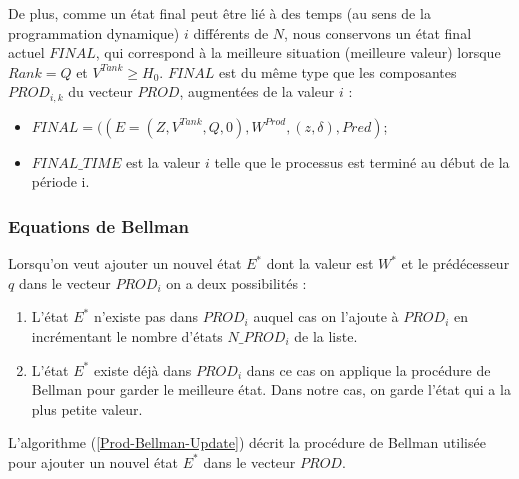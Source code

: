  De plus, comme un état final peut être lié à des temps (au sens de la programmation dynamique) $i$ différents de $N$, nous conservons un état final actuel $FINAL$, qui correspond à la meilleure situation (meilleure valeur) lorsque $Rank = Q$ et $V^{Tank} \geq H_0$. $FINAL$ est du même type que les composantes $PROD_{i,k}$ du vecteur $PROD$, augmentées de la valeur $i$ : 
\begin{itemize}[label=$\square$]

	\item $FINAL = ((E = (Z, V^{Tank}, Q, 0), W^{Prod}, (z,\delta ), Pred) $; 

	\item $FINAL\_TIME$ est la valeur $i $ telle que le processus est terminé au début de la période i.
	\end{itemize}
\subsubsection{Equations de Bellman }
Lorsqu'on veut ajouter un nouvel état $E^*$ dont la valeur est $W^*$ et le prédécesseur $ q$ dans le vecteur $PROD_i$ on a deux possibilités :
\begin{enumerate}
	\item L'état $E^*$ n'existe pas dans $PROD_i$ auquel cas on l'ajoute à $PROD_i$ en incrémentant le nombre d'états $N\_PROD_i$ de la liste.
	\item L'état $E^*$ existe déjà dans $PROD_i$ dans ce cas on applique la procédure de Bellman pour garder le meilleure état. Dans notre cas, on garde l'état qui a la plus petite valeur.
	
\end{enumerate}
L'algorithme (\ref{Prod-Bellman-Update}) décrit la procédure de Bellman utilisée pour ajouter un nouvel état $E^*$ dans le vecteur $PROD$.
